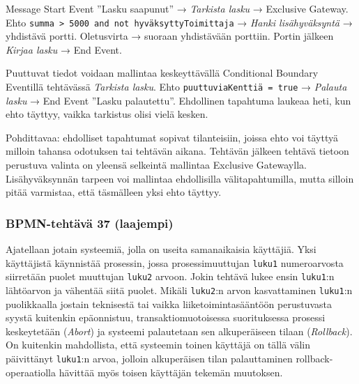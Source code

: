 \documentclass[
  finnish,
  letterpaper,
  DIV=11,
  numbers=noendperiod,
  oneside]{scrreprt}
\begin{document}
\begin{tcolorbox}[enhanced jigsaw, arc=.35mm, bottomrule=.15mm, bottomtitle=1mm, breakable, colback=white, colbacktitle=quarto-callout-tip-color!10!white, colframe=quarto-callout-tip-color-frame, coltitle=black, left=2mm, leftrule=.75mm, opacityback=0, opacitybacktitle=0.6, rightrule=.15mm, title=\textcolor{quarto-callout-tip-color}{\faLightbulb}\hspace{0.5em}{Malliratkaisu}, titlerule=0mm, toprule=.15mm, toptitle=1mm]

Message Start Event ''Lasku saapunut'' → \emph{Tarkista lasku} →
Exclusive Gateway. Ehto
\texttt{summa\ \textgreater{}\ 5000\ and\ not\ hyväksyttyToimittaja} →
\emph{Hanki lisähyväksyntä} → yhdistävä portti. Oletusvirta → suoraan
yhdistävään porttiin. Portin jälkeen \emph{Kirjaa lasku} → End Event.

Puuttuvat tiedot voidaan mallintaa keskeyttävällä Conditional Boundary
Eventillä tehtävässä \emph{Tarkista lasku}. Ehto
\texttt{puuttuviaKenttiä\ =\ true} → \emph{Palauta lasku} → End Event
''Lasku palautettu''. Ehdollinen tapahtuma laukeaa heti, kun ehto
täyttyy, vaikka tarkistus olisi vielä kesken.

Pohdittavaa: ehdolliset tapahtumat sopivat tilanteisiin, joissa ehto voi
täyttyä milloin tahansa odotuksen tai tehtävän aikana. Tehtävän jälkeen
tehtävä tietoon perustuva valinta on yleensä selkeintä mallintaa
Exclusive Gatewaylla. Lisähyväksynnän tarpeen voi mallintaa ehdollisilla
välitapahtumilla, mutta silloin pitää varmistaa, että täsmälleen yksi
ehto täyttyy.

\end{tcolorbox}

\subsubsection{BPMN-tehtävä 37
(laajempi)}\label{bpmn-tehtuxe4vuxe4-37-laajempi}

Ajatellaan jotain systeemiä, jolla on useita samanaikaisia käyttäjiä.
Yksi käyttäjistä käynnistää prosessin, jossa prosessimuuttujan
\texttt{luku1} numeroarvosta siirretään puolet muuttujan \texttt{luku2}
arvoon. Jokin tehtävä lukee ensin \texttt{luku1}:n lähtöarvon ja
vähentää siitä puolet. Mikäli \texttt{luku2}:n arvon kasvattaminen
\texttt{luku1}:n puolikkaalla jostain teknisestä tai vaikka
liiketoimintasääntöön perustuvasta syystä kuitenkin epäonnistuu,
transaktiomuotoisessa suorituksessa prosessi keskeytetään (\emph{Abort})
ja systeemi palautetaan sen alkuperäiseen tilaan (\emph{Rollback}). On
kuitenkin mahdollista, että systeemin toinen käyttäjä on tällä välin
päivittänyt \texttt{luku1}:n arvoa, jolloin alkuperäisen tilan
palauttaminen rollback-operaatiolla hävittää myös toisen käyttäjän
tekemän muutoksen.
\end{document}
